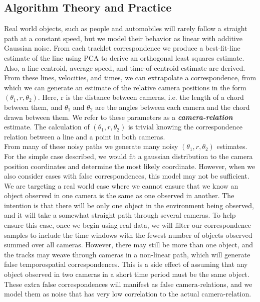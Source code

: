 \documentclass[journal]{IEEEtran}
\begin{document}
	\subsection{Algorithm Theory and Practice}
		\indent Real world objects, such as people and automobiles will rarely follow a straight path at a constant speed, but we model their behavior as linear with additive Gaussian noise. From each tracklet correspondence we produce a best-fit-line estimate of the line using PCA to derive an orthogonal least squares estimate. Also, a line centroid, average speed, and time-of-centroid estimate are derived. From these lines, velocities, and times, we can extrapolate a correspondence, from which we can generate an estimate of the relative camera positions in the form $(\theta_1, r, \theta_2)$. Here, r is the distance between cameras, i.e. the length of a chord between them, and $\theta_1$ and $\theta_2$ are the angles between each camera and the chord drawn between them. We refer to these parameters as a \textbf{\textit{camera-relation}} estimate. The calculation of  $(\theta_1,r,\theta_2)$ is trivial knowing the correspondence relation between a line and a point in both cameras. \\
		\indent From many of these noisy paths we generate many noisy $(\theta_1,r,\theta_2)$ estimates. For the simple case described, we would fit a gaussian distribution to the camera position coordinates and determine the most likely coordinate. However, when we also consider cases with false correspondences, this model may not be sufficient. \\
		\indent We are targeting a real world case where we cannot ensure that we know an object observed in one camera is the same as one observed in another. The intention is that there will be only one object in the environment being observed, and it will take a somewhat straight path through several cameras. To help ensure this case, once we begin using real data, we will filter our correspondence samples to include the time windows with the fewest number of objects observed summed over all cameras. However, there may still be more than one object, and the tracks may weave through cameras in a non-linear path, which will generate false temporospatial correspondences. This is a side effect of assuming that any object observed in two cameras in a short time period must be the same object. These extra false correspondences will manifest as false camera-relations, and we model them as noise that has very low correlation to the actual camera-relation. \\
\end{document}
